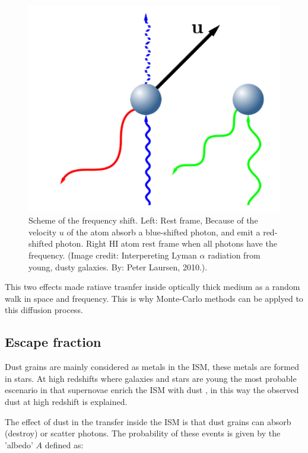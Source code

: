 \begin{figure}[H]
\begin{center}
\includegraphics[scale=0.4]{Figures/xshift.png}
\end{center}\caption{Scheme of the frequency shift. Left: Rest frame, Because 
of the velocity $u$ of the atom absorb a blue-shifted \ly photon, and emit 
a red-shifted \ly photon. Right HI atom rest frame when all photons have the \ly frequency. (Image credit: Interpereting Lyman $\alpha$ radiation from young, dusty galaxies. By: Peter Laursen, 2010.).\label{fig:xshift}}
\end{figure}


This two effects made ratiave trasnfer inside optically thick medium as a random 
walk in space and frequency. This is why Monte-Carlo methods can be
applyed to this diffusion process.
 
\subsection{Escape fraction}\label{sec:ef}

Dust grains are mainly considered as metals in the ISM, these
metals are formed in stars. At high redshifts where galaxies and 
stars are young the most probable escenario in that supernovae 
enrich the ISM with dust \citep{Kotak09}, in this way the observed 
dust \citep{Coppin09}  at high redshift is explained. 

The effect of dust in the \ly transfer inside the ISM is that 
dust grains can absorb (destroy) or scatter \ly photons. The 
probability of these events is given by the 'albedo' $A$ defined as:

